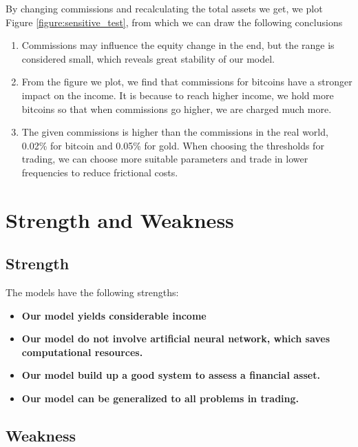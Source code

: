\documentclass[12pt,a4paper]{article}
\begin{document}
\begin{spacing}{1.2}
By changing commissions and recalculating the total assets we get, we plot Figure \ref{figure:sensitive_test}, from which we can draw the following conclusions

\begin{enumerate}
	\item Commissions may influence the equity change in the end, but the range is considered small, which reveals great stability of our model.
	
	\item From the figure we plot, we find that commissions for bitcoins have a stronger impact on the income. It is because to reach higher income, we hold more bitcoins so that when commissions go higher, we are charged much more.
	
	\item The given commissions is higher than the commissions in the real world, 0.02\% for bitcoin and 0.05\% for gold. When choosing the thresholds for trading, we can choose more suitable parameters and trade in lower frequencies to reduce frictional costs.
\end{enumerate}

\section{Strength and Weakness}
\label{Strength_Weakness}


\subsection{Strength}

The models have the following strengths:

\begin{itemize}
\item \textbf{Our model yields considerable income}

\item \textbf{Our model do not involve artificial neural network, which saves computational resources.}

\item \textbf{Our model build up a good system to assess a financial asset.}

\item \textbf{Our model can be generalized to all problems in trading.}

\end{itemize}


\subsection{Weakness}


\end{spacing}
\end{document}
